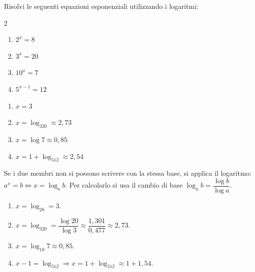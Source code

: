 
\begin{question}[ID=2.5, subtitle={Equazioni esponenziali risolte con i logaritmi}, difficulty=media, tags={equazioni esponenziali, logaritmi}]
Risolvi le seguenti equazioni esponenziali utilizzando i logaritmi:
\begin{center}\begin{minipage}{0.92\linewidth}
\begin{multicols}{2}
\begin{enumerate}[leftmargin=3.2cm]
\item $2^x = 8$
\item $3^x = 20$
\item $10^x = 7$
\item $5^{x-1} = 12$
\end{enumerate}
\end{multicols}
\end{minipage}\end{center}
\begin{solution}
\begin{enumerate}
    \item $x=3$
    \item $x=\log_320\approx2{,}73$
    \item $x=\log7\approx0{,}85$
    \item $x=1+\log_512\approx2{,}54$
\end{enumerate}
\end{solution}
\begin{explanation}
Se i due membri non si possono scrivere con la stessa base, si applica il logaritmo: $a^x=b \iff x=\log_ab$. Per calcolarlo si usa il cambio di base $\log_ab=\dfrac{\log b}{\log a}$.
\begin{enumerate}
    \item $x=\log_28=3$.
    \item $x=\log_320=\dfrac{\log20}{\log3}\approx\dfrac{1{,}301}{0{,}477}\approx2{,}73$.
    \item $x=\log_{10}7\approx0{,}85$.
    \item $x-1=\log_512 \Rightarrow x=1+\log_512\approx1+1{,}54$.
\end{enumerate}
\end{explanation}
\end{question}

